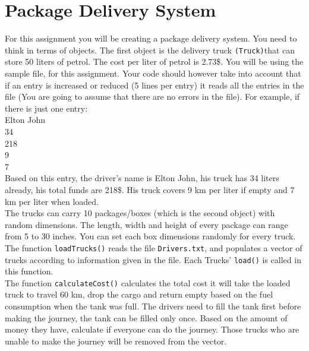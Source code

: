 \documentclass[a4paper,12pt]{article}
\begin{document}
	\section{Package Delivery System}
	For this assignment you will be creating a package delivery system. You need to think in terms of objects.	The first object is the delivery truck \texttt{(Truck)}that can store 50 liters of petrol. The cost per liter of petrol is 2.73\$.	You will be using the sample file,  for this assignment. Your code should however take into account that if an entry is increased or reduced (5 lines per entry) it reads all the entries in the file (You are going to assume that there are no errors in the file). For example, if there is just one entry:\smallskip\\
	
	\noindent Elton John\\
	34\\
	218\\
	9\\
	7\\
	
	

	\noindent Based on this entry, the driver's name is Elton John, his truck has 34 liters already, his total funds are	218\$. His truck covers 9 km per liter if empty and 7 km per liter when loaded.\\

	\noindent The trucks can carry 10 packages/boxes (which is the second object) with random dimensions. The length, width and height of every package can range from 5 to 30 inches. You can set each box dimensions randomly for every truck. \smallskip\\
	
	\noindent The function \texttt{loadTrucks()} reads the file \texttt{Drivers.txt}, and populates a vector of trucks according to information given in the file. Each Trucks' \texttt{load()} is called in this function. \smallskip\\
	
	\noindent The function \texttt{calculateCost()} calculates the total cost it will take the loaded truck to travel 60 km, drop the cargo and return empty based on the fuel consumption when the tank was full. The drivers need to fill the tank first before making the journey, the tank can be filled only once. Based on the amount of money they have, calculate if everyone can do the journey. Those trucks who are unable to make the journey will be removed from the vector. \\
	
\end{document}
